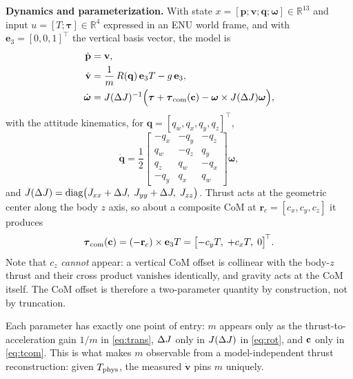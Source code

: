 \textbf{Dynamics and parameterization.} With state
$x = [\mathbf{p}; \mathbf{v}; \mathbf{q}; \boldsymbol{\omega}] \in \mathbb{R}^{13}$ and input
$u = [T; \boldsymbol{\tau}] \in \mathbb{R}^{4}$ expressed in an ENU world frame, and with
$\mathbf{e}_3 = [0, 0, 1]^{\!\top}$ the vertical basis vector, the model is
\begin{align}
\dot{\mathbf{p}} &= \mathbf{v}, \label{eq:kin}\\
\dot{\mathbf{v}} &= \frac{1}{m}\, R(\mathbf{q})\,\mathbf{e}_3 T - g\,\mathbf{e}_3, \label{eq:trans}\\
\dot{\boldsymbol{\omega}} &= J(\Delta J)^{-1}\Bigl( \boldsymbol{\tau} + \boldsymbol{\tau}_{\mathrm{com}}(\mathbf{c}) - \boldsymbol{\omega} \times J(\Delta J)\boldsymbol{\omega} \Bigr), \label{eq:rot}
\end{align}
with the attitude kinematics, for $\mathbf{q} = [q_w, q_x, q_y, q_z]^{\!\top}$,
\begin{equation}
\dot{\mathbf{q}} = \frac{1}{2}
\begin{bmatrix}
-q_x & -q_y & -q_z \\
 q_w & -q_z &  q_y \\
 q_z &  q_w & -q_x \\
-q_y &  q_x &  q_w
\end{bmatrix} \boldsymbol{\omega},
\label{eq:quat}
\end{equation}
and $J(\Delta J) = \mathrm{diag}\bigl(J_{xx} + \Delta J,\; J_{yy} + \Delta J,\; J_{zz}\bigr)$. Thrust acts at
the geometric center along the body $z$ axis, so about a composite CoM at
$\mathbf{r}_c = [c_x, c_y, c_z]$ it produces
\begin{equation}
\boldsymbol{\tau}_{\mathrm{com}}(\mathbf{c}) = (-\mathbf{r}_c) \times \mathbf{e}_3 T = \bigl[-c_y T,\; +c_x T,\; 0\bigr]^{\!\top}. \label{eq:tcom}
\end{equation}
Note that $c_z$ \emph{cannot} appear: a vertical CoM offset is collinear with the body-$z$
thrust and their cross product vanishes identically, and gravity acts at the CoM itself. The
CoM offset is therefore a two-parameter quantity by construction, not by truncation.

Each parameter has exactly one point of entry: $m$ appears only as the thrust-to-acceleration
gain $1/m$ in \eqref{eq:trans}, $\Delta J$ only in $J(\Delta J)$ in \eqref{eq:rot}, and $\mathbf{c}$ only in
\eqref{eq:tcom}. This is what makes $m$ observable from a model-independent thrust
reconstruction: given $T_{\mathrm{phys}}$, the measured $\dot{\mathbf{v}}$ pins $m$ uniquely.

